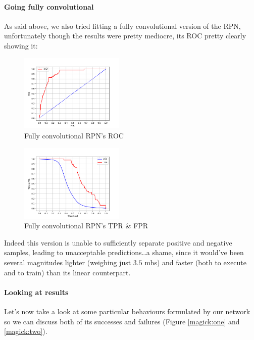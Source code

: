\documentclass[10pt,journal,cspaper,compsoc]{IEEEtran}
\begin{document}
    \paragraph*{Going fully convolutional} As said above, we also tried fitting a fully convolutional version of the RPN, unfortunately though the results were pretty mediocre, its ROC pretty clearly showing it:

    \begin{figure}[h]
        \centering
        \includegraphics[width=0.44\textwidth]{images/ROC_conv.png}
        \caption{Fully convolutional RPN's ROC}
    \end{figure}

    \begin{figure}[h]
        \centering
        \includegraphics[width=0.44\textwidth]{images/threshold_decision_conv.png}
        \caption{Fully convolutional RPN's TPR \& FPR}
    \end{figure}

    Indeed this version is unable to sufficiently separate positive and negative samples, leading to unacceptable predictions\dots a shame, since it would've been several magnitudes lighter (weighing just $3.5$ mbs) and faster (both to execute and to train) than its linear counterpart.
    \paragraph*{Looking at results} Let's now take a look at some particular behaviours formulated by our network so we can discuss both of its successes and failures (Figure \ref{magick:one} and \ref{magick:two}).
\end{document}
